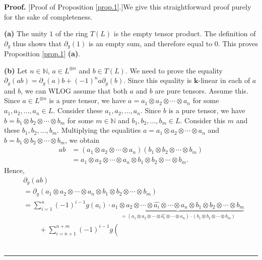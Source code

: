 \documentclass[numbers=enddot,12pt,final,onecolumn,notitlepage]{scrartcl}%
\theoremstyle{definition}
\newenvironment{proof}[1][Proof]{\noindent\textbf{#1.} }{\ \rule{0.5em}{0.5em}}
\let\sumnonlimits\sum
\renewcommand{\sum}{\sumnonlimits\limits}
\begin{document}
\begin{proof}
[Proof of Proposition \ref{prop.1}.]We give this straightforward proof purely
for the sake of completeness. \medskip

\textbf{(a)} The unity $1$ of the ring $T\left(  L\right)  $ is the empty
tensor product. The definition of $\partial_{g}$ thus shows that $\partial
_{g}\left(  1\right)  $ is an empty sum, and therefore equal to $0$. This
proves Proposition \ref{prop.1} \textbf{(a)}. \medskip

\textbf{(b)} Let $n\in\mathbb{N}$, $a\in L^{\otimes n}$ and $b\in T\left(
L\right)  $. We need to prove the equality $\partial_{g}\left(  ab\right)
=\partial_{g}\left(  a\right)  b+\left(  -1\right)  ^{n}a\partial_{g}\left(
b\right)  $. Since this equality is $\mathbf{k}$-linear in each of $a$ and
$b$, we can WLOG assume that both $a$ and $b$ are pure tensors. Assume this.
Since $a\in L^{\otimes n}$ is a pure tensor, we have $a=a_{1}\otimes
a_{2}\otimes\cdots\otimes a_{n}$ for some $a_{1},a_{2},\ldots,a_{n}\in L$.
Consider these $a_{1},a_{2},\ldots,a_{n}$. Since $b$ is a pure tensor, we have
$b=b_{1}\otimes b_{2}\otimes\cdots\otimes b_{m}$ for some $m\in\mathbb{N}$ and
$b_{1},b_{2},\ldots,b_{m}\in L$. Consider this $m$ and these $b_{1}%
,b_{2},\ldots,b_{m}$. Multiplying the equalities $a=a_{1}\otimes a_{2}%
\otimes\cdots\otimes a_{n}$ and $b=b_{1}\otimes b_{2}\otimes\cdots\otimes
b_{m}$, we obtain%
\begin{align*}
ab  &  =\left(  a_{1}\otimes a_{2}\otimes\cdots\otimes a_{n}\right)  \left(
b_{1}\otimes b_{2}\otimes\cdots\otimes b_{m}\right) \\
&  =a_{1}\otimes a_{2}\otimes\cdots\otimes a_{n}\otimes b_{1}\otimes
b_{2}\otimes\cdots\otimes b_{m}.
\end{align*}
Hence,
\begin{align}
&  \partial_{g}\left(  ab\right) \nonumber\\
&  =\partial_{g}\left(  a_{1}\otimes a_{2}\otimes\cdots\otimes a_{n}\otimes
b_{1}\otimes b_{2}\otimes\cdots\otimes b_{m}\right) \nonumber\\
&  =\sum_{i=1}^{n}\left(  -1\right)  ^{i-1}g\left(  a_{i}\right)
\cdot\underbrace{a_{1}\otimes a_{2}\otimes\cdots\otimes\widehat{a_{i}}%
\otimes\cdots\otimes a_{n}\otimes b_{1}\otimes b_{2}\otimes\cdots\otimes
b_{m}}_{=\left(  a_{1}\otimes a_{2}\otimes\cdots\otimes\widehat{a_{i}}%
\otimes\cdots\otimes a_{n}\right)  \cdot\left(  b_{1}\otimes b_{2}%
\otimes\cdots\otimes b_{m}\right)  }\nonumber\\
&  \ \ \ \ \ \ \ \ \ \ +\sum_{i=n+1}^{n+m}\left(  -1\right)  ^{i-1}g\left(

\end{align}
\end{proof}
\end{document}
